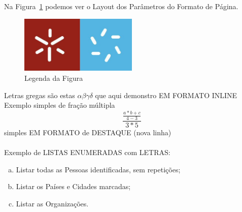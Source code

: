 \documentclass[11pt,a4paper]{report}%
\begin{document}
Na Figura~\ref{fig:layoutDimensions} podemos ver o Layout dos Parâmetros do Formato de Página.

 \begin{figure} %
       \centering %
       \includegraphics[width=0.5\textwidth]{images/logo.jpg}
       \caption{Legenda da Figura} \label{fig:layoutDimensions} %
 \end{figure}

Letras gregas são estas $ \alpha \beta \gamma \delta $ que aqui demonstro EM FORMATO INLINE\\

Exemplo simples de fração múltipla \[ \frac{\frac{a * b + c}{4-3}}{3*5} \] simples  EM FORMATO
de DESTAQUE (nova linha)\\\\

Exemplo de LISTAS ENUMERADAS com LETRAS:
\begin{enumerate}[a)]
\item Listar todas as Pessoas identificadas, sem repetições;
\item Listar os Países e Cidades marcadas;
\item Listar as Organizações.\\ %
\end{enumerate}
\end{document}
